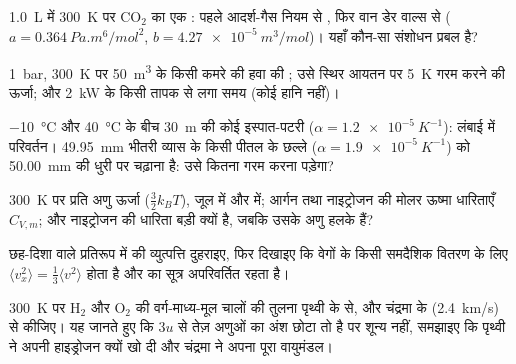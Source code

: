 \begin{exercise}[$\star\star$]\label{exo:b1:kinetic-theory:7}
\qty{1.0}{L} में \qty{300}{K} पर CO$_2$ का एक : पहले आदर्श-गैस नियम से
, फिर वान डेर वाल्स से ($a = \qty{0.364}{Pa.m^6/mol^2}$,
$b = \qty{4.27e-5}{m^3/mol}$)। यहाँ कौन-सा संशोधन प्रबल है?
\end{exercise}

\begin{exercise}[$\star\star$]\label{exo:b1:kinetic-theory:8}
\qty{1}{bar}, \qty{300}{K} पर \qty{50}{m^3} के किसी कमरे की हवा की ; उसे स्थिर आयतन पर \qty{5}{K} गरम करने की ऊर्जा; और \qty{2}{kW} के
किसी तापक से लगा समय (कोई हानि नहीं)।
\end{exercise}

\begin{exercise}[$\star\star$]\label{exo:b1:kinetic-theory:9}
\qty{-10}{\degreeCelsius} और \qty{40}{\degreeCelsius} के बीच \qty{30}{m}
की कोई इस्पात-पटरी ($\alpha = \qty{1.2e-5}{K^{-1}}$): लंबाई में परिवर्तन।
\qty{49.95}{mm} भीतरी व्यास के किसी पीतल के छल्ले
($\alpha = \qty{1.9e-5}{K^{-1}}$) को \qty{50.00}{mm} की धुरी पर चढ़ाना है:
उसे कितना गरम करना पड़ेगा?
\end{exercise}

\begin{exercise}[$\star\star\star$]\label{exo:b1:kinetic-theory:10}
\qty{300}{K} पर प्रति अणु ऊर्जा ($\tfrac32 k_BT$), जूल में और
 में; आर्गन तथा नाइट्रोजन की मोलर ऊष्मा धारिताएँ
$C_{V,m}$; और नाइट्रोजन की धारिता बड़ी क्यों है, जबकि उसके अणु हलके हैं?
\end{exercise}

\begin{exercise}[$\star\star\star$]\label{exo:b1:kinetic-theory:11}
छह-दिशा वाले प्रतिरूप में  की व्युत्पत्ति दुहराइए, फिर दिखाइए कि
वेगों के किसी समदैशिक वितरण के लिए $\langle v_x^2\rangle
= \tfrac13\langle v^2\rangle$ होता है और  का सूत्र अपरिवर्तित रहता है।
\end{exercise}

\begin{exercise}[$\star\star\star$]\label{exo:b1:kinetic-theory:12}
\qty{300}{K} पर H$_2$ और O$_2$ की वर्ग-माध्य-मूल चालों की तुलना पृथ्वी के
 से, और चंद्रमा के (\qty{2.4}{km/s}) से कीजिए। यह जानते हुए कि
$3u$ से तेज़ अणुओं का अंश छोटा तो है पर शून्य नहीं, समझाइए कि पृथ्वी ने
अपनी हाइड्रोजन क्यों खो दी और चंद्रमा ने अपना पूरा वायुमंडल।
\end{exercise}

